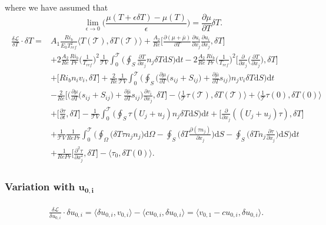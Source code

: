 \documentclass[preprint,12pt]{article}
\begin{document}
where we have assumed that 
\begin{equation}
\lim\limits_{\epsilon\rightarrow 0}\bigg(\frac{\mu(T+\epsilon\delta T)-\mu(T)}{\epsilon}\bigg)=\frac{\partial \mu}{\partial T}\delta T.
\end{equation}
\begin{align}\begin{split}
\frac{\delta \mathcal{L}}{\delta T}\cdot \delta T=&A_1\frac{Ri_b}{E_0T_{ref}^2}\Big\langle T(\mathcal{T}),\delta T(\mathcal{T}) \Big\rangle+\frac{A_2}{Re}\bigg[\frac{\partial (\mu+\overline{\mu})}{\partial T}\frac{\partial u_{i}}{\partial x_j}\frac{\partial u_{i}}{\partial x_j},\delta T\bigg]\\&+2\frac{A_2}{Re}\frac{Ri_b}{Pr}\Big(\frac{1}{T_{ref}}\Big)^2\frac{1}{\mathcal{T}V}\int_0^\mathcal{T}\Big(\oint_S\frac{\partial T}{\partial x_j}  n_j\delta T\text{d}S\Big)\text{d}t-2\frac{A_2}{Re}\frac{Ri_b}{Pr}\Big(\frac{1}{T_{ref}}\Big)^2\bigg[\frac{\partial}{\partial x_j}\Big(\frac{\partial T}{\partial x_j}\Big),\delta T\bigg]\\&+\bigg[Ri_bn_iv_i,\delta T\bigg]+\frac{2}{Re}\frac{1}{\mathcal{T}V}\int_0^\mathcal{T}\Big(\oint_S\Big(\frac{\partial\mu}{\partial T}\big(s_{ij}+S_{ij}\big)+\frac{\partial\bar{\mu}}{\partial T}s_{ij}\Big)  n_j v_i\delta T\text{d}S\Big)\text{d}t\\&-\frac{2}{Re}\Bigg[\Big(\frac{\partial\mu}{\partial T}\big(s_{ij}+S_{ij}\big)+\frac{\partial\bar{\mu}}{\partial T}s_{ij}\Big)\frac{\partial v_i}{\partial x_j}, \delta T\Bigg]-\Big\langle\frac{1}{\mathcal{T}}\tau(\mathcal{T}),\delta T(\mathcal{T}) \Big\rangle+\Big\langle\frac{1}{\mathcal{T}}\tau(0),\delta T(0) \Big\rangle\\&+\bigg[\frac{\partial \tau}{\partial t},\delta T\bigg]-\frac{1}{\mathcal{T}V}\int_0^\mathcal{T}\Big(\oint_S\tau(U_j+u_j)n_j\delta T\text{d}S\Big)\text{d}t+\bigg[\frac{\partial}{\partial x_j}((U_j+u_j)\tau),\delta T\bigg]\\&+\frac{1}{\mathcal{T}V}\frac{1}{RePr}\int_0^\mathcal{T}\Bigg(\oint_\Omega\Big(\delta T \tau n_jn_j\Big) \text{d}\Omega-\oint_S\Big(\delta T\frac{\partial(\tau n_j)}{\partial x_j}\Big) \text{d}S-\oint_S\Big(\delta Tn_j\frac{\partial\tau}{\partial x_j}\Big) \text{d}S\Bigg)\text{d}t\\&+\frac{1}{RePr}\bigg[\frac{\partial^2\tau}{\partial x_j^2},\delta T\bigg]-\langle \tau_0,\delta T(0) \rangle.
\end{split}\end{align}

\subsubsection*{Variation with $\mathbf{u_{0,i}}$}
\begin{align}\label{eq:Adjoint_incompressibility}\begin{split}
&\frac{\delta \mathcal{L}}{\delta u_{0,i}}\cdot \delta u_{0,i}=\langle \delta u_{0,i},v_{0,i}\rangle-\langle cu_{0,i},\delta u_{0,i} \rangle=\langle v_{0,1}-cu_{0,i},\delta u_{0,i}\rangle.
\end{split}\end{align}
\end{document}
